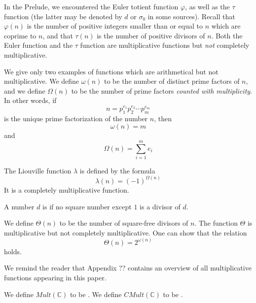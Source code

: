 \begin{example}
In the Prelude, we encountered the Euler totient function $\varphi$, as well as the $\tau$ function (the latter may be denoted by $d$ or $\sigma_0$ in some sources). Recall that $\varphi(n)$ is the number of positive integers smaller than or equal to $n$ which are coprime to $n$, and that $\tau(n)$ is the number of positive divisors of $n$. Both the Euler function and the $\tau$ function are multiplicative functions but \emph{not} completely multiplicative.
\end{example}

\begin{definition}
We give only two examples of functions which are arithmetical but not multiplicative. We define $\omega(n)$ to be the number of distinct prime factors of $n$, and we define $\Omega(n)$ to be the number of prime factors \emph{counted with multiplicity}. In other words, if
$$ n = p_1 ^{e_1} p_2^{e_2} \cdots p_m^{e_m}  $$
is the unique prime factorization of the number $n$, then
$$ \omega(n) = m    $$
and
$$  \Omega(n) = \sum_{i=1}^m  e_i $$
\end{definition}

\begin{example}
The Liouville function $\lambda$ is defined by the formula
$$ \lambda(n) = (-1)^{\Omega(n)}  $$
It is a completely multiplicative function.
\end{example}

\begin{definition}
A number $d$ is  if no square number except $1$ is a divisor of $d$.
\end{definition}

\begin{example}
We define $\Theta(n)$ to be the number of square-free divisors of $n$. The function $\Theta$ is multiplicative but not completely multiplicative. One can show that the relation
$$ \Theta(n) = 2^{\omega(n)}   $$
holds.
\end{example}

We remind the reader that Appendix ?? contains an overview of all multiplicative functions appearing in this paper.

\begin{definition}
We define $Mult(\mathbb{C})$ to be . We define $CMult(\mathbb{C})$ to be .
\end{definition}

